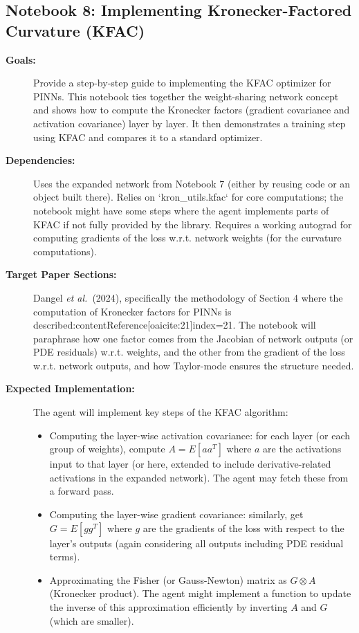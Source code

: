 \documentclass[11pt]{article}
\begin{document}
\subsection{Notebook 8: Implementing Kronecker-Factored Curvature (KFAC)}
\begin{description}
  \item[\textbf{Goals:}] Provide a step-by-step guide to implementing the KFAC optimizer for PINNs. This notebook ties together the weight-sharing network concept and shows how to compute the Kronecker factors (gradient covariance and activation covariance) layer by layer. It then demonstrates a training step using KFAC and compares it to a standard optimizer.
  \item[\textbf{Dependencies:}] Uses the expanded network from Notebook 7 (either by reusing code or an object built there). Relies on `kron_utils.kfac` for core computations; the notebook might have some steps where the agent implements parts of KFAC if not fully provided by the library. Requires a working autograd for computing gradients of the loss w.r.t. network weights (for the curvature computations).
  \item[\textbf{Target Paper Sections:}] Dangel \textit{et al.}\ (2024), specifically the methodology of Section 4 where the computation of Kronecker factors for PINNs is described:contentReference[oaicite:21]{index=21}. The notebook will paraphrase how one factor comes from the Jacobian of network outputs (or PDE residuals) w.r.t. weights, and the other from the gradient of the loss w.r.t. network outputs, and how Taylor-mode ensures the structure needed.
  \item[\textbf{Expected Implementation:}] The agent will implement key steps of the KFAC algorithm:
    \begin{itemize}
      \item Computing the layer-wise activation covariance: for each layer (or each group of weights), compute $A = E[ aa^T ]$ where $a$ are the activations input to that layer (or here, extended to include derivative-related activations in the expanded network). The agent may fetch these from a forward pass.
      \item Computing the layer-wise gradient covariance: similarly, get $G = E[ gg^T ]$ where $g$ are the gradients of the loss with respect to the layer's outputs (again considering all outputs including PDE residual terms).
      \item Approximating the Fisher (or Gauss-Newton) matrix as $G \otimes A$ (Kronecker product). The agent might implement a function to update the inverse of this approximation efficiently by inverting $A$ and $G$ (which are smaller).

\end{itemize}
\end{description}
\end{document}
